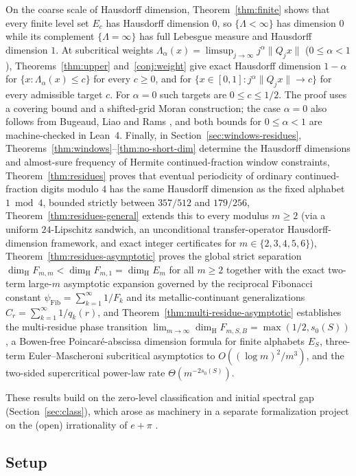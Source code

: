 \documentclass[11pt]{article}
\theoremstyle{definition}
\theoremstyle{remark}
\newcommand{\dimH}{\dim_{\mathrm{H}}}
\newcommand{\Lam}{\Lambda}
\begin{document}
On the coarse scale of Hausdorff dimension, Theorem~\ref{thm:finite} shows that
every finite level set $E_c$ has Hausdorff dimension $0$, so $\{\Lam<\infty\}$
has dimension $0$ while its complement $\{\Lam=\infty\}$ has full Lebesgue
measure and Hausdorff dimension $1$. At subcritical weights
$\Lam_\alpha(x)=\limsup_{j\to\infty}j^\alpha\|Q_jx\|$ ($0\le\alpha<1$),
Theorems~\ref{thm:upper} and~\ref{conj:weight} give exact Hausdorff dimension $1-\alpha$ for
$\{x:\Lam_\alpha(x)\le c\}$ for every $c\ge0$, and for
$\{x\in[0,1]:j^\alpha\|Q_jx\|\to c\}$ for every admissible target $c$.
For $\alpha=0$ such targets are $0\le c\le 1/2$.
The proof uses a covering bound and a shifted-grid Moran construction;
the case $\alpha=0$ also follows from Bugeaud, Liao and Rams \cite{BLR}, and
both bounds for $0\le\alpha<1$ are machine-checked in Lean~4. Finally, in
Section~\ref{sec:windows-residues}, Theorems~\ref{thm:windows}--\ref{thm:no-short-dim}
determine the Hausdorff dimensions and almost-sure frequency of Hermite
continued-fraction window constraints, Theorem~\ref{thm:residues} proves
that eventual periodicity of ordinary continued-fraction digits modulo $4$ has
the same Hausdorff dimension as the fixed alphabet $1\bmod 4$, bounded strictly
between $357/512$ and $179/256$, Theorem~\ref{thm:residues-general} extends this
to every modulus $m\ge2$ (via a uniform $24$-Lipschitz sandwich, an unconditional
transfer-operator Hausdorff-dimension framework, and exact integer certificates
for $m\in\{2,3,4,5,6\}$), Theorem~\ref{thm:residues-asymptotic} proves the
global strict separation $\dimH F_{m,m}<\dimH F_{m,1}=\dimH E_m$ for all $m\ge2$
together with the exact two-term large-$m$ asymptotic expansion governed by the
reciprocal Fibonacci constant $\psi_{\mathrm{Fib}}=\sum_{k=1}^\infty 1/F_k$ and
its metallic-continuant generalizations $C_r=\sum_{k=1}^\infty 1/q_k(r)$, and
Theorem~\ref{thm:multi-residue-asymptotic} establishes the multi-residue
phase transition $\lim_{m\to\infty}\dimH F_{m,S,B}=\max(1/2,s_0(S))$, a
Bowen-free Poincar\'e-abscissa dimension formula for finite alphabets $E_S$,
three-term Euler--Mascheroni subcritical asymptotics to $O((\log m)^2/m^3)$,
and the two-sided supercritical power-law rate $\Theta(m^{-2s_0(S)})$.

These results build on the zero-level classification and initial spectral gap
(Section~\ref{sec:class}), which arose as machinery in a separate formalization
project on the (open) irrationality of $e+\pi$ \cite{Phase1}.

\subsection{Setup}
\end{document}
